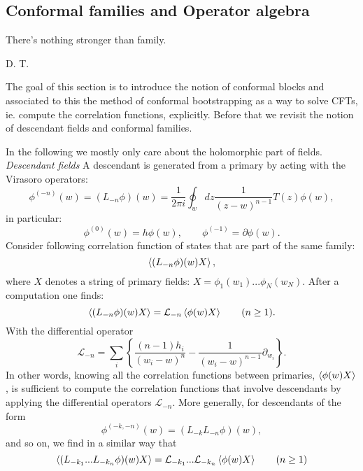 \documentclass[submission, PhysLectNotes]{SciPost}
\begin{document}
\subsection{Conformal families and Operator algebra}
\epigraph{There's nothing stronger than family.}{D. T.}
The goal of this section is to introduce the notion of conformal blocks and associated to this the method of conformal bootstrapping as a way to solve CFTs, ie. compute the correlation functions, explicitly. Before that we revisit the notion of descendant fields and conformal families.

In the following we mostly only care about the holomorphic part of fields.
{\it Descendant fields}
A descendant is generated from a primary by acting with the Virasoro operators:
\begin{equation}
	\phi^{(-n)}(w) = (L_{-n}\phi)(w) = \frac{1}{2\pi i}\oint_w dz \frac{1}{(z-w)^{n-1}}T(z)\phi(w),
\end{equation}
in particular:
\begin{equation}
	\phi^{(0)}(w) = h\phi(w), \qquad \phi^{(-1)} = \partial \phi(w).
\end{equation}
Consider following correlation function of states that are part of the same family:
\begin{equation}
	\expval{(L_{-n}\phi)(w)X},
\end{equation}
where $X$ denotes a string of primary fields: $X=\phi_1(w_1)...\phi_N(w_N)$. After a computation one finds:
\begin{equation}
	\expval{(L_{-n}\phi)(w)X} = \mathcal{L}_{-n}\expval{\phi(w)X} \qquad (n\geq 1).
\end{equation}
With the differential operator
\begin{equation}
	\mathcal{L}_{-n} = \sum_i \left\{ \frac{(n-1)h_i}{(w_i - w)^n} - \frac{1}{(w_i - w)^{n-1}}\partial_{w_i}\right\}.
\end{equation}
In other words, knowing all the correlation functions between primaries, $\expval{\phi(w)X}$, is sufficient to compute the correlation functions that involve descendants by applying the differential operators $\mathcal{L}_{-n}$. More generally, for descendants of the form
\begin{equation}
	\phi^{(-k,-n)}(w) = (L_{-k}L_{-n}\phi)(w),
\end{equation}
and so on, we find in a similar way that
\begin{equation}
	\expval{(L_{-k_1}...L_{-k_n}\phi)(w)X} = \mathcal{L}_{-k_1}...\mathcal{L}_{-k_n}\expval{\phi(w)X} \qquad (n\geq 1)
\end{equation}
\end{document}
